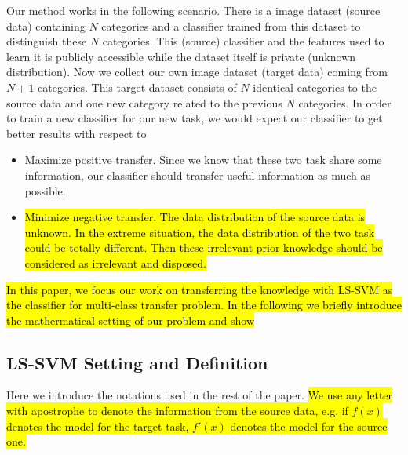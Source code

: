 Our method works in the following scenario. There is a image dataset (source data) containing $N$ categories and a classifier trained from this dataset to distinguish these $N$ categories. This (source) classifier and the features used to learn it is publicly accessible while the dataset itself is private (unknown distribution).  Now we collect our own image dataset (target data) coming from $N+1$ categories. This target dataset consists of $N$ identical categories to the source data and one new category related to the previous $N$ categories. In order to train a new classifier for our new task, we would expect our classifier to get better results with respect to 
\begin{itemize}
\item Maximize positive transfer. Since we know that these two task share some information, our classifier should transfer useful information as much as possible.
\item \hl{Minimize negative transfer. The data distribution of the source data is unknown. In the extreme situation, the data distribution of the two task could be totally different. Then these irrelevant prior knowledge should be considered as irrelevant and disposed.}
\end{itemize}

\hl{In this paper, we focus our work on transferring the knowledge with LS-SVM as the classifier for multi-class transfer problem. In the following we briefly introduce the mathermatical setting of our problem and show   }

\subsection{LS-SVM Setting and Definition}
Here we introduce the notations used in the rest of the paper. \hl{We use any letter with apostrophe to denote the information from the source data, e.g. if $f(x)$ denotes the model for the target task, $f'(x)$ denotes the model for the source one.}

